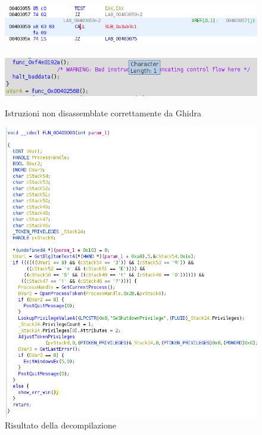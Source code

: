 \documentclass[12pt]{extarticle}
\begin{document}
\vspace{3cm}
\begin{figure}[!h]
\includegraphics[scale=0.8]{immagini/path}
\\\\
\includegraphics[scale=0.8]{immagini/non_risolto}
\caption{Istruzioni non disassemblate correttamente da Ghidra}
\label{Figura 5}
\end{figure}
\vspace{3cm}
\begin{figure}[!h]
\includegraphics[scale=0.51]{immagini/risolto}
\caption{Risultato della decompilazione}
\label{Figura 6}
\end{figure}
\end{document}
